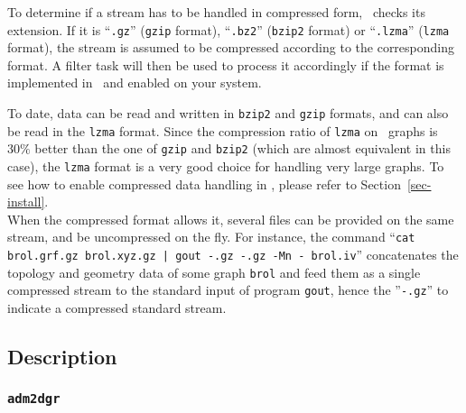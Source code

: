 To determine if a stream has to be handled in compressed form,
\scotch\ checks its extension. If it is ``{\tt .gz}'' ({\tt gzip}
format), ``{\tt .bz2}'' ({\tt bzip2} format) or ``{\tt .lzma}''
({\tt lzma} format), the stream is assumed to be compressed according
to the corresponding format. A filter task will then be used to process
it accordingly if the format is implemented in \scotch\ and enabled on
your system.

To date, data can be read and written in {\tt bzip2} and {\tt gzip}
formats, and can also be read in the {\tt lzma} format. Since the
compression ratio of {\tt lzma} on \scotch\ graphs is $30\%$ better
than the one of {\tt gzip} and {\tt bzip2} (which are almost
equivalent in this case), the {\tt lzma} format is a very good choice
for handling very large graphs. To see how to enable compressed data
handling in \scotch, please refer to Section~\ref{sec-install}.
\\

When the compressed format allows it, several files can be provided on
the same stream, and be uncompressed on the fly. For instance, the
command ``{\tt cat brol.grf.gz brol.xyz.gz | gout -.gz -.gz -Mn -
brol.iv}'' concatenates the topology and geometry data of some graph
{\tt brol} and feed them as a single compressed stream to the standard
input of program {\tt gout}, hence the ''{\tt -.gz}'' to indicate a
compressed standard stream.

\subsection{Description}

\subsubsection{\texttt{adm2dgr}}
\label{sec-prog-admtodgr}

